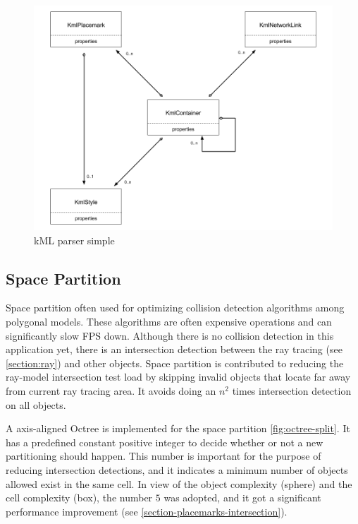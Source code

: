 \begin{figure}[H]
\caption{kML parser simple}
\label{fig:kml-parser-simple}
\centering
\includegraphics[width=\textwidth, keepaspectratio]{Figures/kml-parser-simple.png}
\decoRule
\end{figure}

\subsection{Space Partition} 
\label{section:space-partition}

Space partition often used for optimizing collision detection algorithms among polygonal models. These algorithms are often expensive operations and can significantly slow FPS down. Although there is no collision detection in this application yet, there is an intersection detection between the ray tracing (see \ref{section:ray}) and other objects. Space partition is contributed to reducing the ray-model intersection test load by skipping invalid objects that locate far away from current ray tracing area. It avoids doing an $n^2$ times intersection detection on all objects.

A axis-aligned Octree is implemented for the space partition \ref{fig:octree-split}. It has a predefined constant positive integer to decide whether or not a new partitioning should happen. This number is important for the purpose of reducing intersection detections, and it indicates a minimum number of objects allowed exist in the same cell. In view of the object complexity (sphere) and the cell complexity (box), the number $5$ was adopted, and it got a significant performance improvement (see \ref{section-placemarks-intersection}). 

